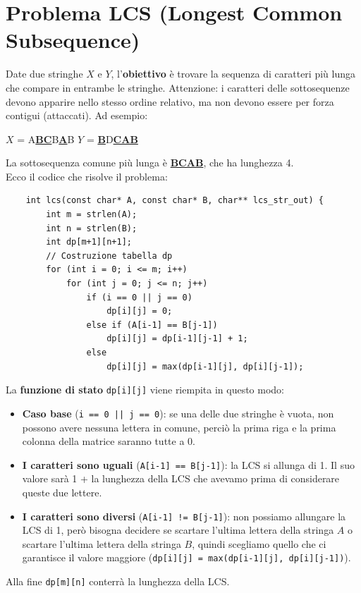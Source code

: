 \section{Problema LCS (Longest Common Subsequence)}
Date due stringhe $X$ e $Y$, l'\textbf{obiettivo} è trovare la sequenza di caratteri più lunga che compare in entrambe le stringhe. Attenzione: i caratteri
delle sottosequenze devono apparire nello stesso ordine relativo, ma non devono essere per forza contigui (attaccati). Ad esempio:\\
\begin{center}
    $X$ = A\textbf{\underline{BC}}B\textbf{\underline{A}}B   \hspace{0.5cm}            $Y$ = \textbf{\underline{B}}D\textbf{\underline{CAB}}\\
\end{center}
La sottosequenza comune più lunga è \textbf{\underline{BCAB}}, che ha lunghezza 4.\smallskip\\

\noindent Ecco il codice che risolve il problema: 
\begin{verbatim}
    int lcs(const char* A, const char* B, char** lcs_str_out) {
        int m = strlen(A);
        int n = strlen(B);
        int dp[m+1][n+1];
        // Costruzione tabella dp
        for (int i = 0; i <= m; i++)
            for (int j = 0; j <= n; j++)
                if (i == 0 || j == 0)
                    dp[i][j] = 0;
                else if (A[i-1] == B[j-1])
                    dp[i][j] = dp[i-1][j-1] + 1;
                else
                    dp[i][j] = max(dp[i-1][j], dp[i][j-1]);
\end{verbatim}
La \textbf{funzione di stato} \texttt{dp[i][j]} viene riempita in questo modo:
\begin{itemize}
    \item \textbf{Caso base} (\texttt{i == 0 || j == 0}): se una delle due stringhe è vuota, non possono avere nessuna lettera in comune, perciò la prima riga e la prima 
    colonna della matrice saranno tutte a 0.
    \item \textbf{I caratteri sono uguali} (\texttt{A[i-1] == B[j-1]}): la LCS si allunga di 1. Il suo valore sarà 1 + la lunghezza della LCS che avevamo 
    prima di considerare queste due lettere.
    \item \textbf{I caratteri sono diversi} (\texttt{A[i-1] != B[j-1]}): non possiamo allungare la LCS di 1, però bisogna decidere se scartare l'ultima lettera
    della stringa $A$ o scartare l'ultima lettera della stringa $B$, quindi scegliamo quello che ci garantisce il valore maggiore (\texttt{dp[i][j] = max(dp[i-1][j], dp[i][j-1])}).
\end{itemize}
Alla fine \texttt{dp[m][n]} conterrà la lunghezza della LCS. %



